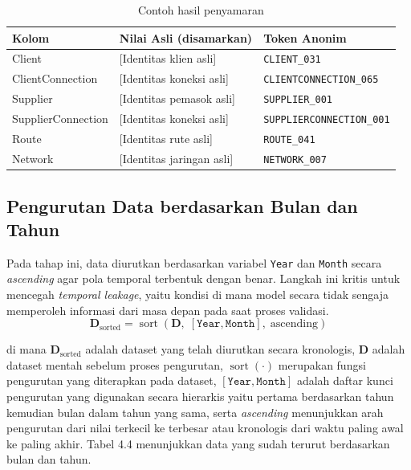 \begin{table}[h]
\centering
\caption{Contoh hasil penyamaran}
\label{tab:contoh_masking}
\begin{tabular}{lll}
\toprule
\textbf{Kolom} & \textbf{Nilai Asli (disamarkan)} & \textbf{Token Anonim} \\
\midrule
Client              & [Identitas klien asli]    & \texttt{CLIENT\_031} \\
ClientConnection    & [Identitas koneksi asli]  & \texttt{CLIENTCONNECTION\_065} \\
Supplier            & [Identitas pemasok asli]  & \texttt{SUPPLIER\_001} \\
SupplierConnection  & [Identitas koneksi asli]  & \texttt{SUPPLIERCONNECTION\_001} \\
Route               & [Identitas rute asli]     & \texttt{ROUTE\_041} \\
Network             & [Identitas jaringan asli] & \texttt{NETWORK\_007} \\
\bottomrule
\end{tabular}
\end{table}

\subsection{Pengurutan Data berdasarkan Bulan dan Tahun}

Pada tahap ini, data diurutkan berdasarkan variabel \texttt{Year} dan \texttt{Month} secara \textit{ascending} agar pola temporal terbentuk dengan benar. Langkah ini kritis untuk mencegah \textit{temporal leakage}, yaitu kondisi di mana model secara tidak sengaja memperoleh informasi dari masa depan pada saat proses validasi.
\begin{equation}
\mathbf{D}_{\text{sorted}} = \operatorname{sort}(\mathbf{D},\;[\texttt{Year},\texttt{Month}],\;\text{ascending})
\end{equation}

\noindent di mana $\mathbf{D}_{\text{sorted}}$ adalah dataset yang telah diurutkan secara kronologis, $\mathbf{D}$ adalah dataset mentah sebelum proses pengurutan, $\operatorname{sort}(\cdot)$ merupakan fungsi pengurutan yang diterapkan pada dataset, $[\texttt{Year}, \texttt{Month}]$ adalah daftar kunci pengurutan yang digunakan secara hierarkis yaitu pertama berdasarkan tahun kemudian bulan dalam tahun yang sama, serta \textit{ascending} menunjukkan arah pengurutan dari nilai terkecil ke terbesar atau kronologis dari waktu paling awal ke paling akhir. Tabel 4.4 menunjukkan data yang sudah terurut berdasarkan bulan dan tahun. 

